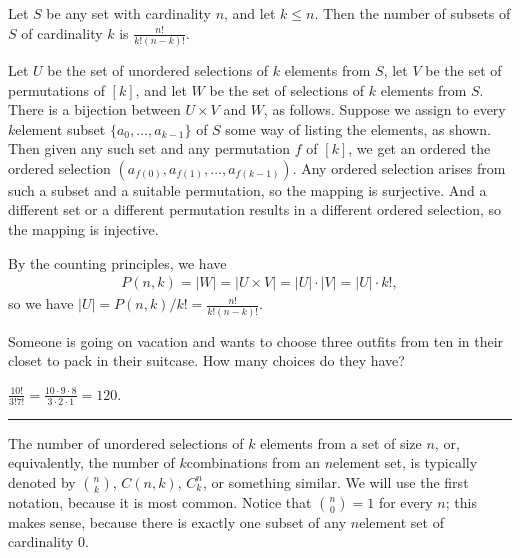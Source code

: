 \documentclass[letterpaper,10pt,english]{sphinxmanual}
\begin{document}
\sphinxAtStartPar
{} Let \(S\) be any set with cardinality \(n\), and let \(k \leq n\). Then the number of subsets of \(S\) of cardinality \(k\) is \(\frac{n!}{k!(n-k)!}\).

\sphinxAtStartPar
{} Let \(U\) be the set of unordered selections of \(k\) elements from \(S\), let \(V\) be the set of permutations of \([k]\), and let \(W\) be the set of  selections of \(k\) elements from \(S\). There is a bijection between \(U \times V\) and \(W\), as follows. Suppose we assign to every \(k\)\sphinxhyphen{}element subset \(\{ a_0, \ldots, a_{k-1} \}\) of \(S\) some way of listing the elements, as shown. Then given any such set and any permutation \(f\) of \([k]\), we get an ordered the ordered selection \((a_{f(0)}, a_{f(1)}, \ldots, a_{f(k-1)})\). Any ordered selection arises from such a subset and a suitable permutation, so the mapping is surjective. And a different set or a different permutation results in a different ordered selection, so the mapping is injective.

\sphinxAtStartPar
By the counting principles, we have
\begin{equation*}
\begin{split}P(n, k) = |W| = |U \times V| = |U| \cdot |V| = |U| \cdot k!,\end{split}
\end{equation*}
\sphinxAtStartPar
so we have \(|U| = P(n,k) / k! = \frac{n!}{k!(n-k)!}\).

\sphinxAtStartPar
{} Someone is going on vacation and wants to choose three outfits from ten in their closet to pack in their suitcase. How many choices do they have?

\sphinxAtStartPar
{} \(\frac{10!}{3! 7!} = \frac{10 \cdot 9 \cdot 8}{3 \cdot 2 \cdot 1} = 120\).


\bigskip\hrule\bigskip


\sphinxAtStartPar
The number of unordered selections of \(k\) elements from a set of size \(n\), or, equivalently, the number of \(k\)\sphinxhyphen{}combinations from an \(n\)\sphinxhyphen{}element set, is typically denoted by \(\binom{n}{k}\), \(C(n, k)\), \(C^n_k\), or something similar. We will use the first notation, because it is most common. Notice that \(\binom{n}0 = 1\) for every \(n\); this makes sense, because there is exactly one subset of any \(n\)\sphinxhyphen{}element set of cardinality \(0\).
\end{document}
